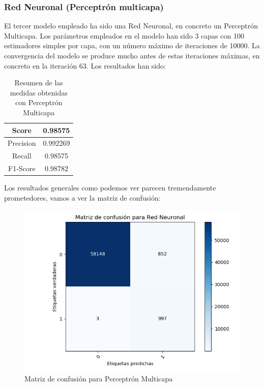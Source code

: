 \subsubsection{Red Neuronal (Perceptrón multicapa)}

El tercer modelo empleado ha sido una Red Neuronal, en concreto un Perceptrón Multicapa. Los parámetros empleados en el modelo han sido 3 capas con 100 estimadores simples por capa, con un número máximo de iteraciones de 10000. La convergencia del modelo se produce mucho antes de estas iteraciones máximas, en concreto en la iteración 63. Los resultados han sido:

\begin{table}[H]
	\centering
	\begin{tabular}{|c|c|}
		\hline
		Score     & 0.98575   \\ \hline
		Precision & 0.992269  \\ \hline
		Recall    & 0.98575   \\ \hline
		F1-Score  & 0.98782 \\ \hline
	\end{tabular}
	\caption{Resumen de las medidas obtenidas con Perceptrón Multicapa}
\end{table}

Los resultados generales como podemos ver parecen tremendamente prometedores, vamos a ver la matriz de confusión:

\begin{figure}[H] %
	\centering
	\includegraphics[scale=0.6]{CONF-NEURONAL.png}  %
	\caption{Matriz de confusión para Perceptrón Multicapa} 
	\label{fig:conf-pmc}
\end{figure}

